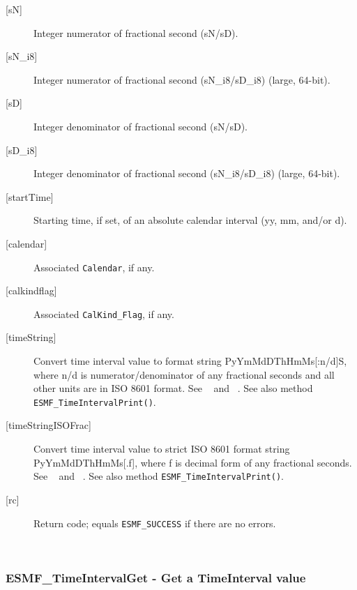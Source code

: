 \begin{description}
       \item[{[sN]}]
            Integer numerator of fractional second (sN/sD).
       \item[{[sN\_i8]}]
            Integer numerator of fractional second (sN\_i8/sD\_i8)
                                                             (large, 64-bit).
       \item[{[sD]}]
            Integer denominator of fractional second (sN/sD).
       \item[{[sD\_i8]}]
            Integer denominator of fractional second (sN\_i8/sD\_i8)
                                                             (large, 64-bit).
       \item[{[startTime]}]
            Starting time, if set, of an absolute calendar interval
            (yy, mm, and/or d).
       \item[{[calendar]}]
            Associated {\tt Calendar}, if any.
       \item[{[calkindflag]}]
            Associated {\tt CalKind\_Flag}, if any.
       \item[{[timeString]}]
            \begin{sloppypar}
            Convert time interval value to format string PyYmMdDThHmMs[:n/d]S,
            where n/d is numerator/denominator of any fractional seconds and
            all other units are in ISO 8601 format.  See ~\cite{ISO} and
            ~\cite{ISOnotes}.  See also method {\tt ESMF\_TimeIntervalPrint()}.
            \end{sloppypar}
       \item[{[timeStringISOFrac]}]
            Convert time interval value to strict ISO 8601 format string
            PyYmMdDThHmMs[.f], where f is decimal form of any fractional
            seconds.  See ~\cite{ISO} and ~\cite{ISOnotes}. See also method
            {\tt ESMF\_TimeIntervalPrint()}.
       \item[{[rc]}]
            Return code; equals {\tt ESMF\_SUCCESS} if there are no errors.
       \end{description}
   
 
\mbox{}\hrulefill\ 
 
\subsubsection [ESMF\_TimeIntervalGet] {ESMF\_TimeIntervalGet - Get a TimeInterval value }


